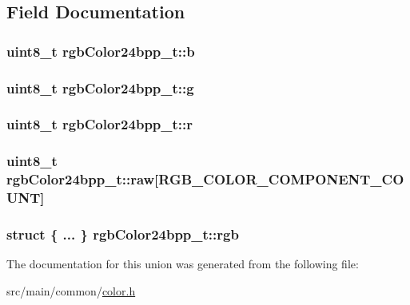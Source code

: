 \subsection{Field Documentation}
\hypertarget{unionrgbColor24bpp__t_a1370c0fd17019d34a9517a48779fea4c}{
\subsubsection[{b}]{\setlength{\rightskip}{0pt plus 5cm}uint8\+\_\+t rgb\+Color24bpp\+\_\+t\+::b}}\label{unionrgbColor24bpp__t_a1370c0fd17019d34a9517a48779fea4c}
\hypertarget{unionrgbColor24bpp__t_a25543b264564b203d170d18f4ddb462f}{
\subsubsection[{g}]{\setlength{\rightskip}{0pt plus 5cm}uint8\+\_\+t rgb\+Color24bpp\+\_\+t\+::g}}\label{unionrgbColor24bpp__t_a25543b264564b203d170d18f4ddb462f}
\hypertarget{unionrgbColor24bpp__t_a36ecdd52162baf9d8f1a809d545702e1}{
\subsubsection[{r}]{\setlength{\rightskip}{0pt plus 5cm}uint8\+\_\+t rgb\+Color24bpp\+\_\+t\+::r}}\label{unionrgbColor24bpp__t_a36ecdd52162baf9d8f1a809d545702e1}
\hypertarget{unionrgbColor24bpp__t_a43d8155d43e2cdacb28bc8a2ea5e7afd}{
\subsubsection[{raw}]{\setlength{\rightskip}{0pt plus 5cm}uint8\+\_\+t rgb\+Color24bpp\+\_\+t\+::raw\mbox{[}{\bf R\+G\+B\+\_\+\+C\+O\+L\+O\+R\+\_\+\+C\+O\+M\+P\+O\+N\+E\+N\+T\+\_\+\+C\+O\+U\+N\+T}\mbox{]}}}\label{unionrgbColor24bpp__t_a43d8155d43e2cdacb28bc8a2ea5e7afd}
\hypertarget{unionrgbColor24bpp__t_aa279c304f032ad531667db94ea7244be}{
\subsubsection[{rgb}]{\setlength{\rightskip}{0pt plus 5cm}struct \{ ... \}   rgb\+Color24bpp\+\_\+t\+::rgb}}\label{unionrgbColor24bpp__t_aa279c304f032ad531667db94ea7244be}


The documentation for this union was generated from the following file\+:\begin{DoxyCompactItemize}
\item 
src/main/common/\hyperlink{color_8h}{color.\+h}\end{DoxyCompactItemize}
